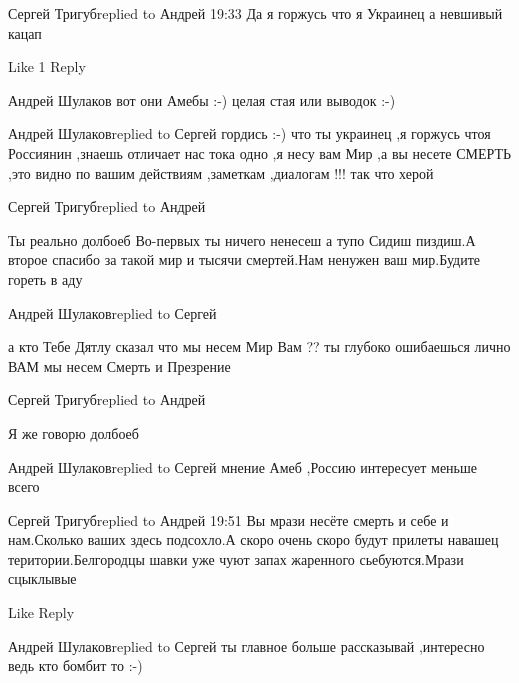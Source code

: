  
 
 
 
 


Сергей Тригубreplied to Андрей
19:33
Да я горжусь что я Украинец а невшивый кацап

    Like 1
    Reply

Андрей Шулаков
вот они Амебы :-) целая стая или выводок :-)

Андрей Шулаковreplied to Сергей
гордись :-) что ты украинец ,я горжусь чтоя Россиянин ,знаешь отличает нас тока одно ,я несу вам Мир ,а вы несете СМЕРТЬ ,это видно по вашим действиям ,заметкам ,диалогам !!!
так что херой

Сергей Тригубreplied to Андрей

Ты реально долбоеб Во-первых ты ничего ненесеш а тупо Сидиш пиздиш.А второе
спасибо за такой мир и тысячи смертей.Нам ненужен ваш мир.Будите гореть в аду

Андрей Шулаковreplied to Сергей

а кто Тебе Дятлу сказал что мы несем Мир Вам ?? ты глубоко ошибаешься лично ВАМ
мы несем Смерть и Презрение

Сергей Тригубreplied to Андрей

Я же говорю долбоеб

Андрей Шулаковreplied to Сергей
мнение Амеб ,Россию интересует меньше всего

Сергей Тригубreplied to Андрей
19:51
Вы мрази несёте смерть и себе и нам.Сколько ваших здесь подсохло.А скоро очень скоро будут прилеты навашец територии.Белгородцы шавки уже чуют запах жаренного сьебуются.Мрази сцыклывые

    Like
    Reply

Андрей Шулаковreplied to Сергей
ты главное больше рассказывай ,интересно ведь кто бомбит то :-)
